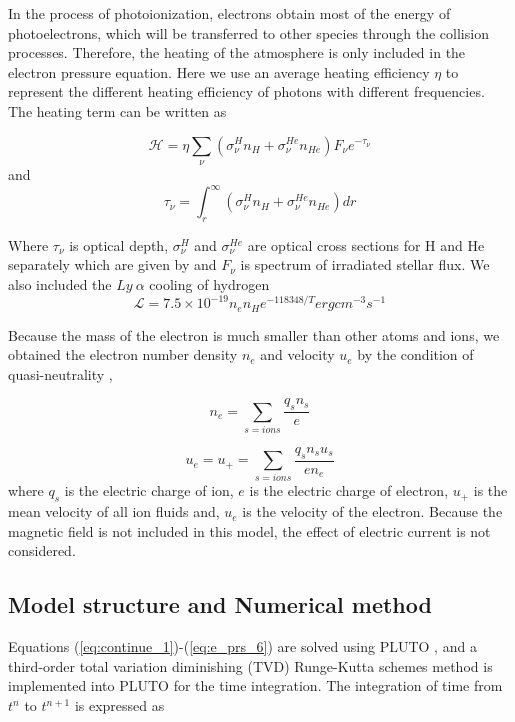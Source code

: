 \documentclass[journal, onecolumn]{aastex631}
\begin{document}
\begin{CJK*}{UTF8}{gbsn}
In the process of photoionization, electrons obtain most of the energy of photoelectrons, which will be transferred to other species through the collision processes. Therefore, the heating of the atmosphere is only included in the electron pressure equation. Here we use an average heating efficiency $\eta$ to represent the different heating efficiency of photons with different frequencies. The heating term can be written as

\begin{equation}\label{eq:heat}
\mathscr{H}=\eta \sum_{\nu}(\sigma_{\nu}^{H}n_{H}+\sigma_{\nu}^{He}n_{He}) F_{\nu}e^{-\tau_{\nu}}
\end{equation}
and
\begin{equation}\label{eq:tau_get}
\tau_{\nu} = \int^{\infty}_{r}(\sigma_{\nu}^{H}n_{H}+\sigma_{\nu}^{He}n_{He})dr
\end{equation}

Where $\tau_{\nu}$ is optical depth, $\sigma_{\nu}^{H}$ and $\sigma_{\nu}^{He}$ are optical cross sections for H and He separately which are given by \cite{Ricotti2002} and $F_\nu$ is spectrum of irradiated stellar flux. We also included the $Ly\ \alpha$ cooling of hydrogen \citep{Murray2009}
\begin{equation}\label{eq:cooling}
\mathscr{L}=7.5\times 10^{-19}n_{e}n_{H}e^{-118348/T}ergcm^{-3}s^{-1}
\end{equation}

Because the mass of the electron is much smaller than other atoms and ions, we obtained the electron number density $n_e$ and velocity $u_e$ by the condition of quasi-neutrality \citep{Toth2012},

\begin{equation}\label{eq:QN_ne}
n_ {e} = \sum_{s=ions}\frac{q_ {s}n_ {s}}{e}
\end{equation}

\begin{equation}\label{eq:QN_ue}
u_{e}=u_{+} = \sum_{s=ions}\frac{q_ {s}n_ {s}u_ {s}}{en_ {e}}
\end{equation}
where $q_s$ is the electric charge of ion, $e$ is the electric charge of electron, $u_+$ is the mean velocity of all ion fluids and, $u_{e}$ is the velocity of the electron. Because the magnetic field is not included in this model, the effect of electric current is not considered.


\subsection{Model structure and Numerical method}\label{subsec:num_method}
Equations (\ref{eq:continue_1})-(\ref{eq:e_prs_6}) are solved using PLUTO \citep{Mignone2007}, and a third-order total variation diminishing (TVD) Runge-Kutta schemes method is implemented into PLUTO for the time integration. The integration of time from $t^{n}$ to $t^{n+1}$ is expressed as


\end{CJK*}
\end{document}
